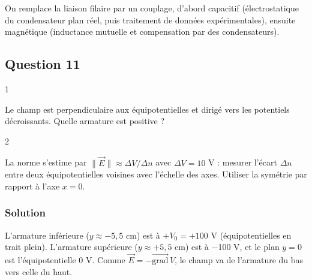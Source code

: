 \documentclass[11pt,a4paper]{article}
\begin{document}
On remplace la liaison filaire par un couplage, d'abord capacitif (électrostatique du condensateur plan réel, puis traitement de données expérimentales), ensuite magnétique (inductance mutuelle et compensation par des condensateurs).

\hypertarget{question-11}{%
\subsection{Question 11}\label{question-11}}

\begin{indication}{1}

Le champ est perpendiculaire aux équipotentielles et dirigé vers les potentiels décroissants. Quelle armature est positive ?

\end{indication}

\begin{indication}{2}

La norme s'estime par \(\|\vec E\|\approx\Delta V/\Delta n\) avec \(\Delta V=10\) V : mesurer l'écart \(\Delta n\) entre deux équipotentielles voisines avec l'échelle des axes. Utiliser la symétrie par rapport à l'axe \(x=0\).

\end{indication}

\hypertarget{solution-10}{%
\subsubsection{Solution}\label{solution-10}}

L'armature inférieure (\(y\approx-5{,}5\) cm) est à \(+V_0=+100\) V (équipotentielles en trait plein). L'armature supérieure (\(y\approx+5{,}5\) cm) est à −100 V, et le plan \(y=0\) est l'équipotentielle 0 V. Comme \(\vec E=-\overrightarrow{\text{grad}}\,V\), le champ va de l'armature du bas vers celle du haut.
\end{document}
